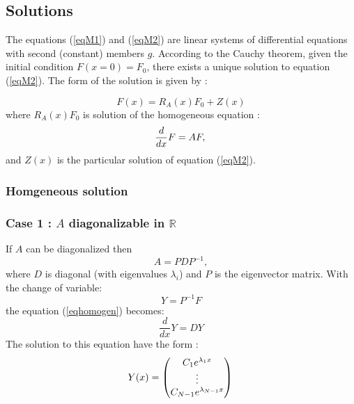 \documentclass[a4paper,12pt]{article}
\begin{document}
 \subsection{Solutions}
 The equations  (\ref{eqM1}) and (\ref{eqM2}) are linear systems of differential equations with second (constant) members $g$. According to the Cauchy theorem, given the initial condition $F(x=0)=F_0$, there exists a unique solution to equation (\ref{eqM2}). The form of the solution is given by :
 
 
 \begin{equation}
F(x) = R_A(x)F_0 + Z(x)
\end{equation}
where $R_A(x)F_0$ is solution of the homogeneous equation : 
 \begin{equation}
\frac{d}{dx}F=AF , \\
\label{eqhomogen}
\end{equation}
 and $Z(x)$ is the particular solution of equation (\ref{eqM2}).
 \subsubsection{Homgeneous solution}

 \subsubsection*{Case 1 : $A$ diagonalizable in $\mathbb{R}$}
 If $A$ can be diagonalized then 
  \begin{equation}
 A=P D P^{-1},
 \end{equation}
 where $D$ is  diagonal (with eigenvalues $\lambda_i$) and $P$ is the eigenvector matrix. 
 With the change of variable: 
 \begin{equation}
 Y=P^{-1}F
 \end{equation}
 the equation  (\ref{eqhomogen}) becomes:
  \begin{equation}
\frac{d}{dx}Y=DY
 \end{equation}
The solution to this equation have the form :\\

  \begin{equation}
  Y(x)=\begin{pmatrix}
 C_1 e^{\lambda_1 x} \\
  \vdots\\
 C_{N-1} e^{\lambda_{N-1} x}\end{pmatrix} \\
  \end{equation}
  
\end{document}
